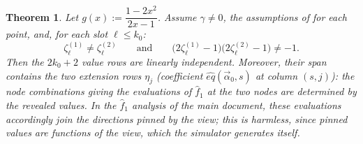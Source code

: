 \documentclass{article}
\newtheorem{theorem}{Theorem}
\theoremstyle{definition}
\begin{document}
\begin{theorem}\label{thm:twopoint}
Let $g(x) := \dfrac{1 - 2x^2}{2x - 1}$. Assume $\gamma \neq 0$, the assumptions of  for each point, and, for each slot $\ell \leq k_0$:
\[
\zeta^{(1)}_\ell \neq \zeta^{(2)}_\ell \qquad \text{and} \qquad \big(2\zeta^{(1)}_\ell - 1\big)\big(2\zeta^{(2)}_\ell - 1\big) \neq -1 .
\]
Then the $2k_0 + 2$ value rows are linearly independent. Moreover, their span contains the two extension rows $\eta_j$ (coefficient $\hat{eq}(\vec{\alpha}_0, s)$ at column $(s,j)$): the node combinations giving the evaluations of $\hat{f}_1$ at the two nodes are determined by the revealed values. In the $\hat{f}_1$ analysis of the main document, these evaluations accordingly join the directions pinned by the view; this is harmless, since pinned values are functions of the view, which the simulator generates itself.
\end{theorem}
\end{document}
